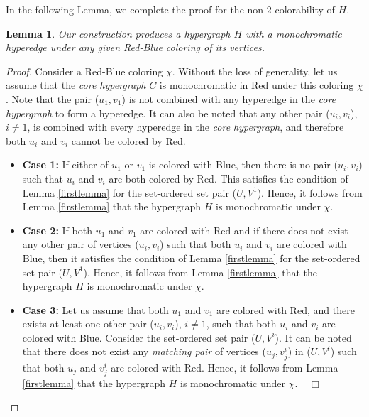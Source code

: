 \documentclass[11pt]{article}
\newtheorem{lemma}{Lemma}
\def\qed{$\Box$}
\begin{document}
\noindent In the following Lemma, we complete the proof for the non $2$-colorability of $H$.
\begin{lemma}
Our construction produces a hypergraph $H$ with a monochromatic hyperedge under any given Red-Blue coloring of its vertices.
\end{lemma}
\begin{proof}
Consider a Red-Blue coloring $\chi$. Without the loss of generality, let us assume that the \textit{core hypergraph} $C$ is monochromatic in Red under this coloring $\chi$. Note that the pair ($u_1,v_1$) is not combined with any hyperedge in the \textit{core hypergraph} to form a hyperedge. It can also be noted that any other pair ($u_i,v_i$), $i\not=1$, is combined with every hyperedge in the \textit{core hypergraph}, and therefore both $u_i$ and $v_i$ cannot be colored by Red.

\begin{itemize}
\item \textbf{Case 1:}
If either of $u_1$ or $v_1$ is colored with Blue, then there is no pair ($u_i,v_i$) such that $u_i$ and $v_i$ are both colored by Red. This satisfies the condition of Lemma \ref{firstlemma} for the set-ordered set pair ($U,V^1$). Hence, it follows from Lemma \ref{firstlemma} that the hypergraph $H$ is monochromatic under $\chi$.

\item \textbf{Case 2:}
If both $u_1$ and $v_1$ are colored with Red and if there does not exist any other pair of vertices ($u_i,v_i$) such that both $u_i$ and $v_i$ are colored with Blue, then it satisfies the condition of Lemma \ref{firstlemma} for the set-ordered set pair ($U,V^1$). Hence, it follows from Lemma \ref{firstlemma} that the hypergraph $H$ is monochromatic under $\chi$.

\item \textbf{Case 3:}
Let us assume that both $u_1$ and $v_1$ are colored with Red, and there exists at least one other pair ($u_i,v_i$), $i\not=1$, such that both $u_i$ and $v_i$ are colored with Blue. Consider the set-ordered set pair ($U,V^i$). It can be noted that there does not exist any \textit{matching pair} of vertices ($u_j,v_j^i$) in ($U,V^i$) such that both $u_j$ and $v_j^i$ are colored with Red. Hence, it follows from Lemma \ref{firstlemma} that the hypergraph $H$ is monochromatic under $\chi$.$\;\;\;\;$\qed\\
\end{itemize}
\end{proof}
\end{document}
